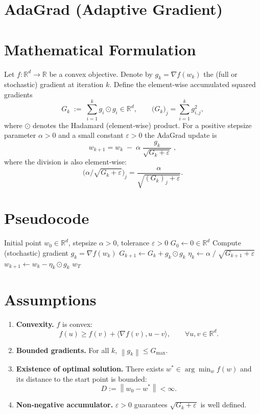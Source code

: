 \documentclass{article}
\newcommand{\R}{\mathbb{R}}
\newcommand{\norm}[1]{\left\lVert #1 \right\rVert}
\begin{document}
\section*{AdaGrad (Adaptive Gradient) }

\section*{Mathematical Formulation}
Let $f:\R^{d}\rightarrow\R$ be a convex objective.  
Denote by $g_{k}=\nabla f(w_{k})$ the (full or stochastic) gradient at iteration $k$.  
Define the element‑wise accumulated squared gradients
\[
G_{k}\;:=\;\sum_{i=1}^{k} g_{i}\odot g_{i}\in\R^{d},
\qquad 
\bigl(G_{k}\bigr)_{j}=\sum_{i=1}^{k} g_{i,j}^{2},
\]
where $\odot$ denotes the Hadamard (element‑wise) product.  
For a positive stepsize parameter $\alpha>0$ and a small constant $\varepsilon>0$ the AdaGrad update is
\[
\boxed{
w_{k+1}= w_{k}\;-\;\alpha\;\frac{g_{k}}{\sqrt{G_{k}+\varepsilon}}\;,
}
\tag{1}
\]
where the division is also element‑wise:
\[
\bigl(\alpha/\sqrt{G_{k}+\varepsilon}\bigr)_{j}
   =\frac{\alpha}{\sqrt{(G_{k})_{j}+\varepsilon}} .
\]

\section*{Pseudocode}
\begin{algorithm}[H]
\caption{AdaGrad}
\begin{algorithmic}[1]
\Require Initial point $w_{0}\in\R^{d}$, stepsize $\alpha>0$, tolerance $\varepsilon>0$
\State $G_{0}\gets 0\in\R^{d}$ 
    \State Compute (stochastic) gradient $g_{k}= \nabla f(w_{k})$
    \State $G_{k+1}\gets G_{k}+g_{k}\odot g_{k}$ 
    \State $ \eta_{k}\gets \alpha\;/\;\sqrt{G_{k+1}+\varepsilon}$ 
    \State $w_{k+1}\gets w_{k}-\eta_{k}\odot g_{k}$ 
\EndFor
\State \Return $w_{T}$
\end{algorithmic}
\end{algorithm}

\section*{Assumptions}
\begin{enumerate}
\item \textbf{Convexity.} $f$ is convex:
\[
f(u)\ge f(v)+\langle\nabla f(v),u-v\rangle,\qquad\forall u,v\in\R^{d}.
\tag{A1}
\]
\item \textbf{Bounded gradients.} For all $k$, $\norm{g_{k}}\le G_{\max}$.
\item \textbf{Existence of optimal solution.} There exists $w^{*}\in\arg\min_{w}f(w)$ and its distance to the start point is bounded:
\[
D:=\norm{w_{0}-w^{*}}<\infty .
\tag{A2}
\]
\item \textbf{Non‑negative accumulator.} $\varepsilon>0$ guarantees $\sqrt{G_{k}+\varepsilon}$ is well defined.
\end{enumerate}
\end{document}
